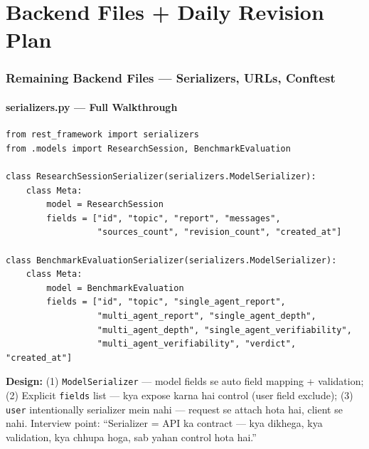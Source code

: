 \newpage

\part{Backend Files + Daily Revision Plan}

\section{Remaining Backend Files --- Serializers, URLs, Conftest}

\subsection{serializers.py --- Full Walkthrough}

\begin{codestorybox}
\begin{lstlisting}[style=pythonstyle, caption={serializers.py --- dono serializers}]
from rest_framework import serializers
from .models import ResearchSession, BenchmarkEvaluation

class ResearchSessionSerializer(serializers.ModelSerializer):
    class Meta:
        model = ResearchSession
        fields = ["id", "topic", "report", "messages",
                  "sources_count", "revision_count", "created_at"]

class BenchmarkEvaluationSerializer(serializers.ModelSerializer):
    class Meta:
        model = BenchmarkEvaluation
        fields = ["id", "topic", "single_agent_report",
                  "multi_agent_report", "single_agent_depth",
                  "multi_agent_depth", "single_agent_verifiability",
                  "multi_agent_verifiability", "verdict", "created_at"]
\end{lstlisting}

\textbf{Design:} (1) \texttt{ModelSerializer} --- model fields se auto field mapping + validation; (2) Explicit \texttt{fields} list --- kya expose karna hai control (user field exclude); (3) \texttt{user} intentionally serializer mein nahi --- request se attach hota hai, client se nahi. Interview point: ``Serializer = API ka contract --- kya dikhega, kya validation, kya chhupa hoga, sab yahan control hota hai.''
\end{codestorybox}

